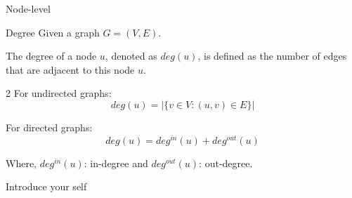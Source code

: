 \documentclass{beamer}
\begin{document}
    \begin{frame}{Node-level}
        \begin{exampleblock}{Degree}
            Given a graph $G = (V, E)$.
            

            The degree of a node $u$, denoted as $deg(u)$, is defined as the number of edges that are adjacent to this node $u$.
            
            \begin{multicols}{2} %
                For undirected graphs:
                \begin{equation}
                    deg(u) = |\{v \in V : (u, v) \in E\}|
                \end{equation}
        
                For directed graphs:
                \begin{equation}
                    deg(u) = deg^{in}(u) + deg^{out}(u)
                \end{equation}
            \end{multicols}
            
            Where, $deg^{in}(u)$: in-degree and $deg^{out}(u)$: out-degree. \newline


        \end{exampleblock}
        \vspace{-5mm}


        \begin{note}
            {Introduce your self}
        \end{note}
    \end{frame}
\end{document}
